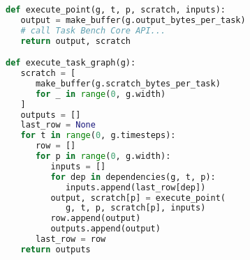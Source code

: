 \begin{lstlisting}[language=Python,caption={Excerpt from Task Bench implementation in Dask.\label{lst:code-sample}},float]
def execute_point(g, t, p, scratch, inputs):
   output = make_buffer(g.output_bytes_per_task)
   # call Task Bench Core API...
   return output, scratch

def execute_task_graph(g):
   scratch = [
      make_buffer(g.scratch_bytes_per_task)
      for _ in range(0, g.width)
   ]
   outputs = []
   last_row = None
   for t in range(0, g.timesteps):
      row = []
      for p in range(0, g.width):
         inputs = []
         for dep in dependencies(g, t, p):
            inputs.append(last_row[dep])
         output, scratch[p] = execute_point(
            g, t, p, scratch[p], inputs)
         row.append(output)
         outputs.append(output)
      last_row = row
   return outputs
\end{lstlisting}
